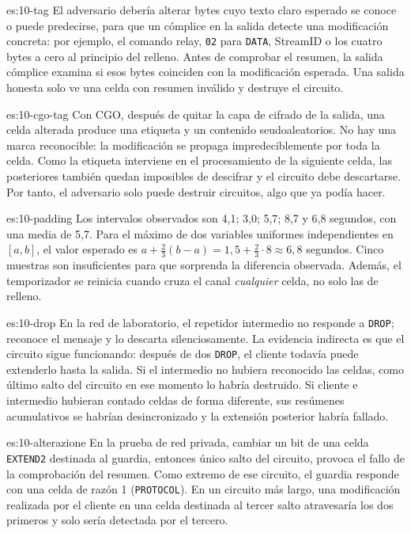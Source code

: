 \begin{soluzione}{es:10-tag}
El adversario debería alterar bytes cuyo texto claro esperado se conoce o puede predecirse, para que un cómplice en la salida detecte una modificación concreta: por ejemplo, el comando relay, \texttt{02} para \texttt{DATA}, StreamID o los cuatro bytes a cero al principio del relleno. Antes de comprobar el resumen, la salida cómplice examina si esos bytes coinciden con la modificación esperada. Una salida honesta solo ve una celda con resumen inválido y destruye el circuito.
\end{soluzione}

\begin{soluzione}{es:10-cgo-tag}
Con CGO, después de quitar la capa de cifrado de la salida, una celda alterada produce una etiqueta y un contenido seudoaleatorios. No hay una marca reconocible: la modificación se propaga impredeciblemente por toda la celda. Como la etiqueta interviene en el procesamiento de la siguiente celda, las posteriores también quedan imposibles de descifrar y el circuito debe descartarse. Por tanto, el adversario solo puede destruir circuitos, algo que ya podía hacer.
\end{soluzione}

\begin{soluzione}{es:10-padding}
Los intervalos observados son 4,1; 3,0; 5,7; 8,7 y 6,8 segundos, con una media de 5,7. Para el máximo de dos variables uniformes independientes en $[a,b]$, el valor esperado es $a+\tfrac{2}{3}(b-a)=1{,}5+\tfrac{2}{3}\cdot8\approx6{,}8$ segundos. Cinco muestras son insuficientes para que sorprenda la diferencia observada. Además, el temporizador se reinicia cuando cruza el canal \emph{cualquier} celda, no solo las de relleno.
\end{soluzione}

\begin{soluzione}{es:10-drop}
En la red de laboratorio, el repetidor intermedio no responde a \texttt{DROP}; reconoce el mensaje y lo descarta silenciosamente. La evidencia indirecta es que el circuito sigue funcionando: después de dos \texttt{DROP}, el cliente todavía puede extenderlo hasta la salida. Si el intermedio no hubiera reconocido las celdas, como último salto del circuito en ese momento lo habría destruido. Si cliente e intermedio hubieran contado celdas de forma diferente, sus resúmenes acumulativos se habrían desincronizado y la extensión posterior habría fallado.
\end{soluzione}

\begin{soluzione}{es:10-alterazione}
En la prueba de red privada, cambiar un bit de una celda \texttt{EXTEND2} destinada al guardia, entonces único salto del circuito, provoca el fallo de la comprobación del resumen. Como extremo de ese circuito, el guardia responde con una celda  de razón 1 (\texttt{PROTOCOL}). En un circuito más largo, una modificación realizada por el cliente en una celda destinada al tercer salto atravesaría los dos primeros y solo sería detectada por el tercero.
\end{soluzione}
